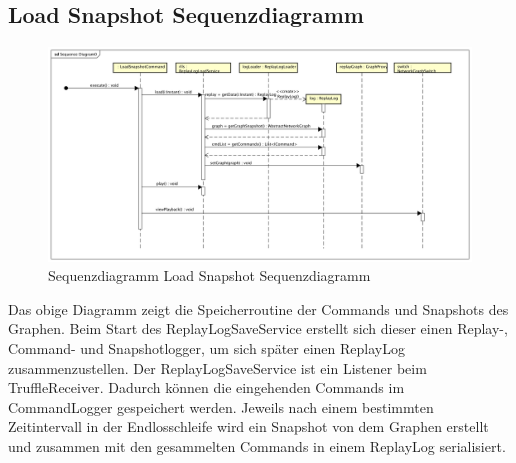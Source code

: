 \subsection{Load Snapshot Sequenzdiagramm}
\begin{figure}
  \centering
  \includegraphics[width=\textwidth]{../diagramimages/sd_loadsnapshot.png}
  \caption[Sequenzdiagramm Load Snapshot Sequenzdiagramm]{Sequenzdiagramm Load Snapshot Sequenzdiagramm}
\end{figure}
\FloatBarrier

Das obige Diagramm zeigt die Speicherroutine der Commands und Snapshots des Graphen. Beim Start des ReplayLogSaveService erstellt sich dieser einen Replay-, Command- und Snapshotlogger, um sich später einen ReplayLog zusammenzustellen. Der ReplayLogSaveService ist ein Listener beim TruffleReceiver. Dadurch können die eingehenden Commands im CommandLogger gespeichert werden. Jeweils nach einem bestimmten Zeitintervall in der Endlosschleife wird ein Snapshot von dem Graphen erstellt und zusammen mit den gesammelten Commands in einem ReplayLog serialisiert. 
